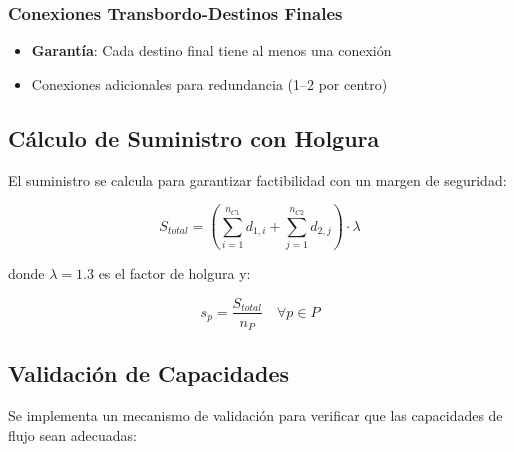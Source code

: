 \documentclass[12pt]{article}
\begin{document}
\subsubsection{Conexiones Transbordo-Destinos Finales}
\begin{itemize}[leftmargin=*]
    \item \textbf{Garantía}: Cada destino final tiene al menos una conexión
    \item Conexiones adicionales para redundancia (1--2 por centro)
\end{itemize}

\subsection{Cálculo de Suministro con Holgura}

El suministro se calcula para garantizar factibilidad con un margen de seguridad:

\begin{equation}
S_{total} = \left(\sum_{i=1}^{n_{C1}} d_{1,i} + \sum_{j=1}^{n_{C2}} d_{2,j}\right) \cdot \lambda
\end{equation}

donde $\lambda = 1.3$ es el factor de holgura y:

\begin{equation}
s_p = \frac{S_{total}}{n_P} \quad \forall p \in P
\end{equation}

\subsection{Validación de Capacidades}

Se implementa un mecanismo de validación para verificar que las capacidades de flujo sean adecuadas:
\end{document}
